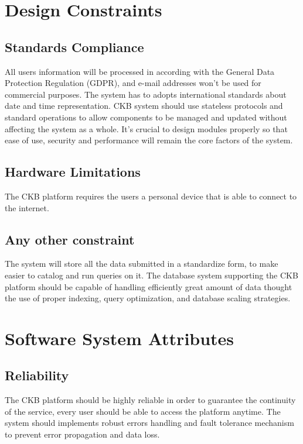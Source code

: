 \section{Design Constraints}
\subsection{Standards Compliance}
All users information will be processed in according with the General Data Protection
Regulation (GDPR), and e-mail addresses won't be used for commercial purposes.\newline
The system has to adopts international standards about date and time representation. \newline
CKB system should use stateless protocols and standard operations to allow components to be managed and updated without affecting the system as a whole. It’s crucial to design modules properly so that ease of use, security and performance will remain the core factors of the system.

\subsection{Hardware Limitations}
The CKB platform requires the users a personal device that is able to connect to the internet. 

\subsection{Any other constraint}
The system will store all the data submitted in a standardize form, to make easier to catalog and run queries on it. \newline
The database system supporting the CKB platform should be capable of handling efficiently great amount of data thought the use of proper indexing, query optimization, and database scaling strategies. 

\section{Software System Attributes}
\subsection{Reliability}
The CKB platform should be highly reliable in order to guarantee the continuity of the service, every user should be able to access the platform anytime. The system should implements robust errors handling and fault tolerance mechanism to prevent error propagation and data loss. 


